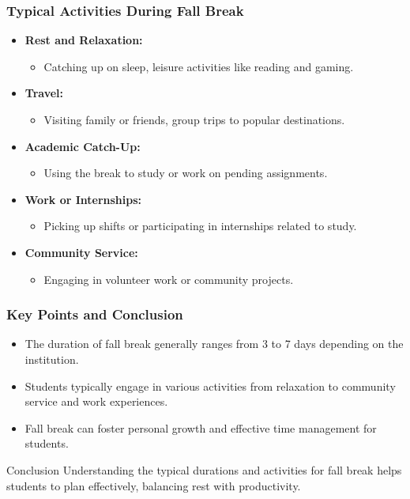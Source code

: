 \documentclass[aspectratio=169]{beamer}
\begin{document}
\begin{frame}[fragile]
    \frametitle{Typical Activities During Fall Break}
    \begin{itemize}
        \item \textbf{Rest and Relaxation:} 
        \begin{itemize}
            \item Catching up on sleep, leisure activities like reading and gaming.
        \end{itemize}
        \item \textbf{Travel:}
        \begin{itemize}
            \item Visiting family or friends, group trips to popular destinations.
        \end{itemize}
        \item \textbf{Academic Catch-Up:} 
        \begin{itemize}
            \item Using the break to study or work on pending assignments.
        \end{itemize}
        \item \textbf{Work or Internships:}
        \begin{itemize}
            \item Picking up shifts or participating in internships related to study.
        \end{itemize}
        \item \textbf{Community Service:}
        \begin{itemize}
            \item Engaging in volunteer work or community projects.
        \end{itemize}
    \end{itemize}
\end{frame}

\begin{frame}[fragile]
    \frametitle{Key Points and Conclusion}
    \begin{itemize}
        \item The duration of fall break generally ranges from 3 to 7 days depending on the institution.
        \item Students typically engage in various activities from relaxation to community service and work experiences.
        \item Fall break can foster personal growth and effective time management for students.
    \end{itemize}
    \begin{block}{Conclusion}
        Understanding the typical durations and activities for fall break helps students to plan effectively, balancing rest with productivity.
    \end{block}
\end{frame}
\end{document}
